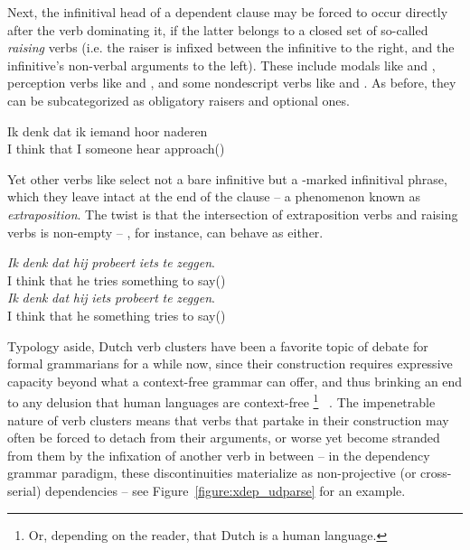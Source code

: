 Next, the infinitival head of a dependent clause may be forced to occur directly after the verb dominating it, if the latter belongs to a closed set of so-called \textit{raising} verbs (i.e. the raiser is infixed between the infinitive to the right, and the infinitive's non-verbal arguments to the left).
These include modals like  and , perception verbs like  and , and some nondescript verbs like  and .
As before, they can be subcategorized as obligatory raisers and optional ones.
\begin{exe}
\ex
\gll Ik denk dat ik iemand hoor naderen\\
I think that I someone hear approach()\\
\end{exe}
Yet other verbs like  select not a bare infinitive but a -marked infinitival phrase, which they leave intact at the end of the clause -- a phenomenon known as \textit{extraposition}.
The twist is that the intersection of extraposition verbs and raising verbs is non-empty -- , for instance, can behave as either.

\goodbreak\begin{exe}
\ex\label{gloss:vr_vs_xpos}
\begin{xlist}
\ex
\gll \textit{Ik} \textit{denk} \textit{dat} \textit{hij} \textit{probeert} \textit{iets} \textit{te} \textit{zeggen}.\\
I think that he tries something to say()\\
\ex
\gll \textit{Ik} \textit{denk} \textit{dat} \textit{hij} \textit{iets} \textit{probeert} \textit{te} \textit{zeggen}.\\
I think that he something tries to say()\\
\end{xlist}
\end{exe}

Typology aside, Dutch verb clusters have been a favorite topic of debate for formal grammarians for a while now, since their construction requires expressive capacity beyond what a context-free grammar can offer, and thus brinking an end to any delusion that human languages are context-free%
	\footnote{Or, depending on the reader, that Dutch is a human language.}%
~\cite[\textit{inter alia}]{huybregts1984weak,shieber1985evidence}.
The impenetrable nature of verb clusters means that verbs that partake in their construction may often be forced to detach from their arguments, or worse yet become stranded from them by the infixation of another verb in between -- in the dependency grammar paradigm, these discontinuities materialize as non-projective (or cross-serial) dependencies -- see Figure~\ref{figure:xdep_udparse} for an example.

